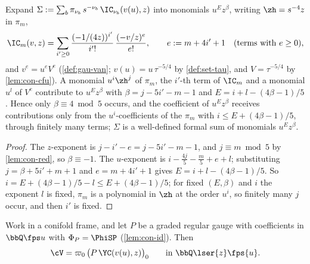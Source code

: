 
\begin{lem}
\label{lem:con-key}
Expand $\Sigma:=\sum_b\pi_{\nu_b}\,s^{-\nu_b}\,\IC_{\nu_b}(v(u),z)$ into monomials $u^Ez^\beta$, writing $\zh=s^{-4}z$ in $\pi_m$,
\[
\IC_m(v,z)=\sum_{i'\geq0}\frac{(-1/(4z))^{i'}}{i'!}\,\frac{(-v/z)^e}{e!},\qquad e:=m+4i'+1\quad(\text{terms with }e\geq0),
\]
and $v^e=u^eV^e$ (\cref{def:gau-van}; $v(u)=u\,\tau^{-5/4}$ by \cref{def:set-tau}, and $V=\tau^{-5/4}$ by \cref{lem:con-cfu}). A monomial $u^i\zh^j$ of $\pi_m$, the $i'$-th term of $\IC_m$ and a monomial $u^l$ of $V^e$ contribute to $u^Ez^\beta$ with $\beta=j-5i'-m-1$ and $E=i+l-(4\beta-1)/5$. Hence only $\beta\equiv4\bmod5$ occurs, and the coefficient of $u^Ez^\beta$ receives contributions only from the $u^i$-coefficients of the $\pi_m$ with $i\leq E+(4\beta-1)/5$, through finitely many terms; $\Sigma$ is a well-defined formal sum of monomials $u^Ez^\beta$.
\end{lem}

\begin{proof}
The $z$-exponent is $j-i'-e=j-5i'-m-1$, and $j\equiv m\bmod5$ by \cref{lem:con-red}, so $\beta\equiv-1$. The $u$-exponent is $i-\frac{4j}5-\frac m5+e+l$; substituting $j=\beta+5i'+m+1$ and $e=m+4i'+1$ gives $E=i+l-(4\beta-1)/5$. So $i=E+(4\beta-1)/5-l\leq E+(4\beta-1)/5$; for fixed $(E,\beta)$ and $i$ the exponent $l$ is fixed, $\pi_m$ is a polynomial in $\zh$ at the order $u^i$, so finitely many $j$ occur, and then $i'$ is fixed.
\end{proof}

\begin{prop}
\label{prop:con-res}
Work in a conifold frame, and let $P$ be a graded regular gauge with coefficients in $\bbQ\fps u$ with $\Phi_P=\PhiSP$ (\cref{lem:con-id}). Then
\[
\cV=\varpi_0\,\bigl(P\,\YC(v(u),z)\bigr)_0\qquad\text{in }\bbQ\lser{z}\fps{u}.
\]
\end{prop}

